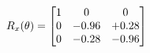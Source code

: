 \documentclass[preview]{standalone}
\begin{document}
\begin{align*}
\special{dvisvgm:raw <g id='unique000'>}R_{x}(\theta) = \begin{bmatrix}1 & 0 & 0 \\0 & -0.96 & +0.28 \\0 & -0.28 & -0.96\end{bmatrix}\special{dvisvgm:raw </g>}
\end{align*}
\end{document}

